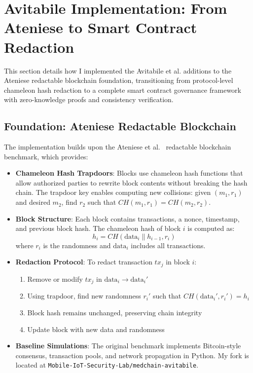 \section{Avitabile Implementation: From Ateniese to Smart Contract Redaction}
\label{sec:avitabile_implementation}

This section details how I implemented the Avitabile et al. additions to the Ateniese redactable blockchain foundation, transitioning from protocol-level chameleon hash redaction to a complete smart contract governance framework with zero-knowledge proofs and consistency verification.

\subsection{Foundation: Ateniese Redactable Blockchain}

The implementation builds upon the Ateniese et al.~\cite{ateniese2017redactable} redactable blockchain benchmark, which provides:

\begin{itemize}
    \item \textbf{Chameleon Hash Trapdoors}: Blocks use chameleon hash functions that allow authorized parties to rewrite block contents without breaking the hash chain. The trapdoor key enables computing new collisions: given $(m_1, r_1)$ and desired $m_2$, find $r_2$ such that $CH(m_1, r_1) = CH(m_2, r_2)$.
    
    \item \textbf{Block Structure}: Each block contains transactions, a nonce, timestamp, and previous block hash. The chameleon hash of block $i$ is computed as:
    \begin{equation}
        h_i = CH(\text{data}_i \| h_{i-1}, r_i)
    \end{equation}
    where $r_i$ is the randomness and $\text{data}_i$ includes all transactions.
    
    \item \textbf{Redaction Protocol}: To redact transaction $tx_j$ in block $i$:
    \begin{enumerate}
        \item Remove or modify $tx_j$ in $\text{data}_i \to \text{data}_i'$
        \item Using trapdoor, find new randomness $r_i'$ such that $CH(\text{data}_i', r_i') = h_i$
        \item Block hash remains unchanged, preserving chain integrity
        \item Update block with new data and randomness
    \end{enumerate}
    
    \item \textbf{Baseline Simulations}: The original benchmark implements Bitcoin-style consensus, transaction pools, and network propagation in Python. My fork is located at \texttt{Mobile-IoT-Security-Lab/medchain-avitabile}.
\end{itemize}

